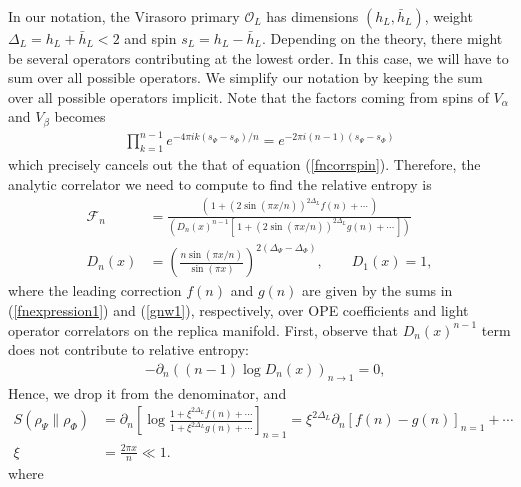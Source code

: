 \documentclass[11pt]{article}
\newcommand{\p}{\partial}
\newcommand{\mO}{\mathcal{O}}
\newcommand{\nn}{\nonumber}
\newcommand{\lb}{\left(}
\newcommand{\rb}{\right)}
\begin{document}
  In our notation, the Virasoro primary $\mO_{L}$ has
  dimensions $(h_{L},\bar{h}_{L})$, weight $\Delta_{L}=h_{L}+\bar{h}_{L}<2$ and spin $s_{L}=h_{L}-\bar{h}_{L}$. Depending on the theory, there might be several operators contributing at the lowest order. In this case, we will have to sum over all possible operators.
We simplify our notation by keeping the sum over all possible operators implicit. Note that the factors coming from spins of $V_\alpha$ and $V_\beta$ becomes
\begin{align}
 \prod_{k=1}^{n-1} e^{-4\pi i k (s_\Psi-s_\Phi)/n}=e^{-2\pi i (n-1)(s_\Psi-s_\Phi)}
\end{align}
which precisely cancels out the that of equation (\ref{fncorrspin}).
Therefore, the analytic correlator we need to compute to find the relative entropy is
  \begin{align}
    \label{eq:F_n}\mathcal{F}_{n} & =\frac{\lb\,1+(2\sin(\pi x/n))^{2\Delta_L}f(n)+\cdots\,\rb}{\lb D_n(x)^{n-1}\left[\,1+(2\sin(\pi x/n))^{2\Delta_L}g(n)+\cdots\,\right] \rb}\\
    \label{Dn}
    D_{n}(x)&=\left(\frac{n\sin(\pi x/n)}{\sin(\pi x)}\right)^{2(\Delta_\Psi-\Delta_\Phi)}
    ,\qquad D_{1}(x)=1,
  \end{align}
  where the leading correction $f(n)$ and $g(n)$ are given by the sums in (\ref{fnexpression1}) and (\ref{gnw1}), respectively, over OPE coefficients and light operator correlators on the replica manifold. 
  First, observe that $D_n(x)^{n-1}$ term does not contribute to relative entropy:
  \begin{align}
  &-\p_n\lb (n-1)\log D_n(x)\rb_{n\to 1}=0,
  \end{align}
Hence, we drop it from the denominator, and
  \begin{align}
    S(\rho_\Psi  \| \rho_\Phi)&=\p_n\left[\log \frac{1+\xi^{2\Delta_L} f(n)+\cdots}{1+\xi^{2\Delta_L} g(n)+\cdots}\right]_{n=1}=\xi^{2\Delta_L}\p_n\left[f(n)-g(n)\right]_{n=1}+\cdots\nn\\
    \xi&=\frac{2\pi x}{n}\ll 1.
  \end{align}
where
\end{document}
